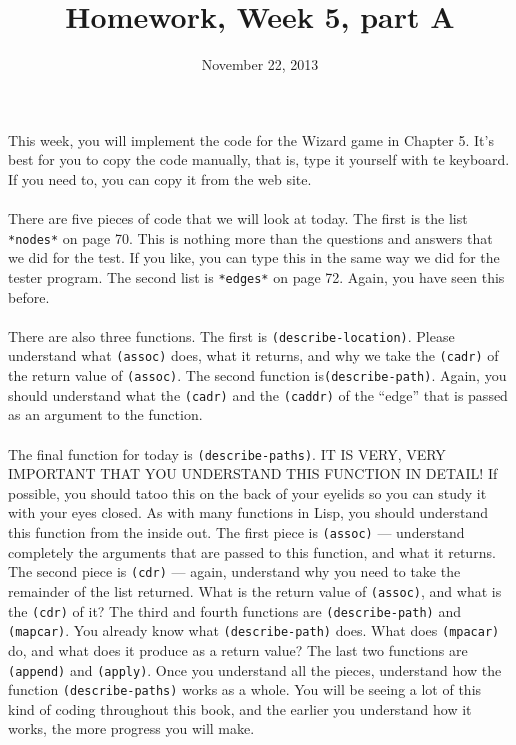 \documentclass{article}
\title{Homework, Week 5, part A}
\date{November 22, 2013}
\begin{document}
\maketitle{}

\paragraph{}This week, you will implement the code for the Wizard game in Chapter 5. It's best for you to copy the code manually, that is, type it yourself with te keyboard. If you need to, you can copy it from the web site.

\paragraph{}There are five pieces of code that we will look at today. The first is the list \texttt{*nodes*} on page 70. This is nothing more than the questions and answers that we did for the test. If you like, you can type this in the same way we did for the tester program. The second list is \texttt{*edges*} on page 72. Again, you have seen this before.

\paragraph{} There are also three functions. The first is \texttt{(describe-location)}. Please understand what \texttt{(assoc)} does, what it returns, and why we take the \texttt{(cadr)} of the return value of \texttt{(assoc)}. The second function is\texttt{(describe-path)}. Again, you should understand what the \texttt{(cadr)} and the \texttt{(caddr)} of the ``edge'' that is passed as an argument to the function.

\paragraph{}The final function for today is \texttt{(describe-paths)}. IT IS VERY, VERY IMPORTANT THAT YOU UNDERSTAND THIS FUNCTION IN DETAIL! If possible, you should tatoo this on the back of your eyelids so you can study it with your eyes closed. As with many functions in Lisp, you should understand this function from the inside out. The first piece is \texttt{(assoc)} --- understand completely the arguments that are passed to this function, and what it returns. The second piece is \texttt{(cdr)} --- again, understand why you need to take the remainder of the list returned. What is the return value of \texttt{(assoc)}, and what is the \texttt{(cdr)} of it? The third and fourth functions are \texttt{(describe-path)} and \texttt{(mapcar)}. You already know what \texttt{(describe-path)} does. What does \texttt{(mpacar)} do, and what does it produce as a return value? The last two functions are \texttt{(append)} and \texttt{(apply)}. Once you understand all the pieces, understand how the function \texttt{(describe-paths)} works as a whole. You will be seeing a lot of this kind of coding throughout this book, and the earlier you understand how it works, the more progress you will make.
\end{document}
